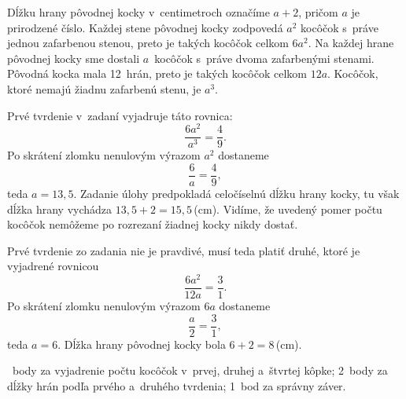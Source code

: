 {%
Dĺžku hrany pôvodnej kocky v~centimetroch označíme $a+2$, pričom $a$ je
prirodzené číslo.
Každej stene pôvodnej kocky zodpovedá $a^2$ kocôčok s~práve jednou
zafarbenou stenou, preto je takých kocôčok celkom $6a^2$.
Na každej hrane pôvodnej kocky sme dostali $a$~kocôčok s~práve dvoma
zafarbenými stenami.
Pôvodná kocka mala 12~hrán, preto je takých kocôčok celkom $12a$.
Kocôčok, ktoré nemajú žiadnu zafarbenú stenu, je $a^3$.

Prvé tvrdenie v~zadaní vyjadruje táto rovnica:
$$
\frac{6a^2}{a^3}=\frac49.
$$
Po skrátení zlomku nenulovým výrazom $a^2$ dostaneme
$$
\frac6a=\frac49,
$$
teda $a= 13{,}5$.
Zadanie úlohy predpokladá celočíselnú dĺžku hrany kocky, tu však dĺžka hrany
vychádza $13{,}5 + 2=15{,}5$\,(cm).
Vidíme, že uvedený pomer počtu kocôčok nemôžeme po rozrezaní žiadnej
kocky nikdy dostať.

Prvé tvrdenie zo zadania nie je pravdivé, musí teda platiť druhé,
ktoré je vyjadrené rovnicou
$$
\frac{6a^2}{12a}=\frac31.
$$
Po skrátení zlomku nenulovým výrazom $6a$ dostaneme
$$
\frac{a}{2}=\frac31,
$$
teda $a=6$.
Dĺžka hrany pôvodnej kocky bola $6 + 2 = 8$\,(cm).

~body za vyjadrenie počtu kocôčok v~prvej, druhej a~štvrtej kôpke;
2~body za dĺžky hrán podľa prvého a~druhého tvrdenia;
1~bod za správny záver.
\endhodnotenie
}

